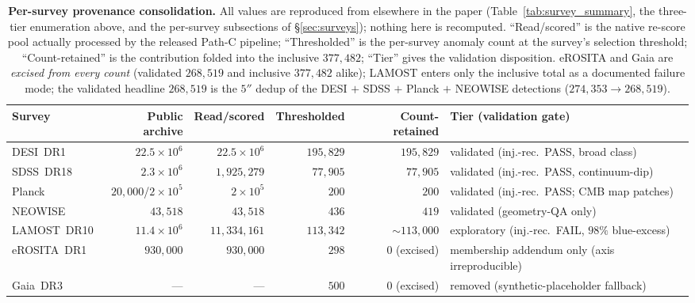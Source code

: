 \documentclass[aps,prd,twocolumn,superscriptaddress,showpacs,preprintnumbers,nofootinbib,longbibliography,floatfix]{revtex4-2}
\begin{document}
\begin{table}[tb]
\caption{\label{tab:provenance} \textbf{Per-survey provenance consolidation.} All values are reproduced from elsewhere in the paper (Table~\ref{tab:survey_summary}, the three-tier enumeration above, and the per-survey subsections of \S\ref{sec:surveys}); nothing here is recomputed. ``Read/scored'' is the native re-score pool actually processed by the released Path-C pipeline; ``Thresholded'' is the per-survey anomaly count at the survey's selection threshold; ``Count-retained'' is the contribution folded into the inclusive $377{,}482$; ``Tier'' gives the validation disposition. eROSITA and Gaia are \emph{excised from every count} (validated $268{,}519$ and inclusive $377{,}482$ alike); LAMOST enters only the inclusive total as a documented failure mode; the validated headline $268{,}519$ is the $5''$ dedup of the DESI $+$ SDSS $+$ Planck $+$ NEOWISE detections ($274{,}353 \to 268{,}519$).}
\begin{ruledtabular}
\begin{tabular}{lrrrrl}
Survey & Public archive & Read/scored & Thresholded & Count-retained & Tier (validation gate) \\
\hline
DESI~DR1 & $22.5\times10^{6}$ & $22.5\times10^{6}$ & $195{,}829$ & $195{,}829$ & validated (inj.-rec.\ PASS, broad class) \\
SDSS~DR18 & $2.3\times10^{6}$ & $1{,}925{,}279$ & $77{,}905$\footnotemark[1] & $77{,}905$ & validated (inj.-rec.\ PASS, continuum-dip) \\
Planck & $20{,}000$/$2{\times}10^{5}$\footnotemark[2] & $2\times10^{5}$ & $200$ & $200$ & validated (inj.-rec.\ PASS; CMB map patches) \\
NEOWISE & $43{,}518$ & $43{,}518$ & $436$ & $419$\footnotemark[3] & validated (geometry-QA only) \\
LAMOST~DR10 & $11.4\times10^{6}$ & $11{,}334{,}161$ & $113{,}342$ & $\sim\!113{,}000$ & exploratory (inj.-rec.\ FAIL, $98\%$ blue-excess) \\
eROSITA~DR1 & $930{,}000$ & $930{,}000$ & $298$ & $0$ (excised) & membership addendum only (axis irreproducible) \\
Gaia~DR3 & --- & --- & $500$ & $0$ (excised) & removed (synthetic-placeholder fallback) \\
\end{tabular}
\end{ruledtabular}
\end{table}
\end{document}

